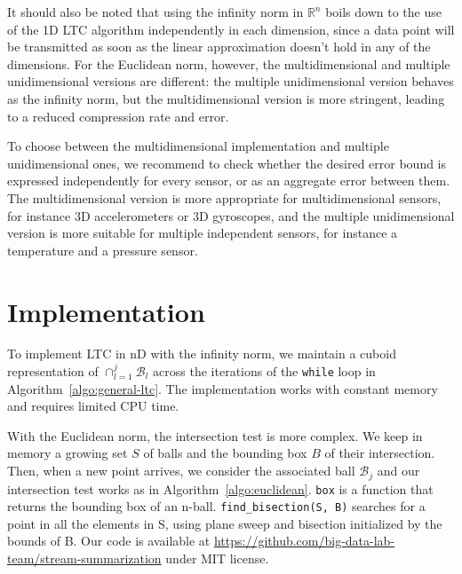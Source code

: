 \documentclass[10pt, conference, compsocconf]{IEEEtran}
\begin{document}
It should also be noted that using the infinity norm in $\mathbb{R}^n$ 
boils down to the use of the 1D LTC algorithm independently in each 
dimension, since a data point will be transmitted as soon as the linear 
approximation doesn't hold in any of the dimensions. For the Euclidean 
norm, however, the multidimensional and multiple unidimensional 
versions are different: the multiple unidimensional version 
behaves as the infinity norm, but the multidimensional version is more 
stringent, leading to a reduced compression rate and error.

To choose between the multidimensional implementation and multiple 
unidimensional ones, we recommend to check whether the desired 
error bound is expressed independently for every sensor, or as an aggregate error between them.
The multidimensional version is
more appropriate for multidimensional sensors, for instance 3D 
accelerometers or 3D gyroscopes, and the multiple unidimensional 
version is more suitable for multiple independent sensors, for 
instance a temperature and a pressure sensor.

\section{Implementation}
\label{sec:implementation}

To implement LTC in nD with the infinity norm, we maintain a cuboid 
representation of $\cap_{l=1}^j{\mathcal{B}_l}$ across the 
iterations of the \texttt{while} loop in 
Algorithm~\ref{algo:general-ltc}. The implementation works with
constant memory and requires limited CPU time.

With the Euclidean norm, the intersection test is more complex. We keep 
in memory a growing set $S$ of balls and the bounding box $B$ of their 
intersection. Then, when a new point arrives, we consider the 
associated ball $\mathcal{B}_j$ and our intersection test works as in 
Algorithm~\ref{algo:euclidean}. \texttt{box} is a function that returns 
the bounding box of an n-ball. \texttt{find\_bisection(S, B)} searches 
for a point in all the elements in S, using plane sweep and bisection 
initialized by the bounds of B. Our code is available at 
\url{https://github.com/big-data-lab-team/stream-summarization} under 
MIT license.
\end{document}
